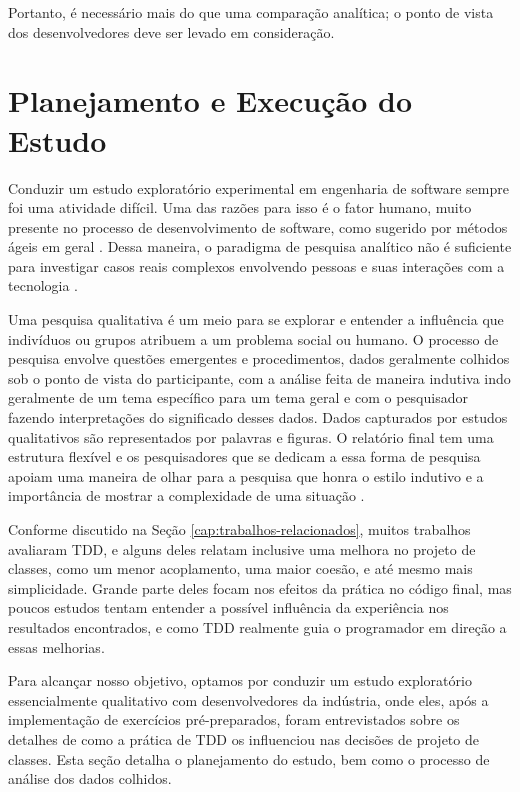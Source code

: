 \documentclass[conference]{IEEEtran}
\begin{document}
Portanto, é necessário mais do que uma comparação analítica; o
ponto de vista dos desenvolvedores deve ser levado em consideração.

\section{Planejamento e Execução do Estudo} 
\label{sec:planejamento}

Conduzir um estudo exploratório experimental em engenharia de software sempre foi uma
atividade difícil. Uma das razões para isso é o fator humano, muito presente 
no processo de desenvolvimento de software, como sugerido por métodos ágeis  em
geral \cite{AgileManifesto}. Dessa maneira, o paradigma de pesquisa analítico 
não é suficiente para investigar casos reais complexos envolvendo pessoas e 
suas interações com a tecnologia \cite{guidelines-case-study}.

Uma pesquisa qualitativa é um meio para se explorar e entender a influência que 
indivíduos ou grupos atribuem a um problema social ou humano. O processo de
pesquisa envolve questões emergentes e procedimentos, dados geralmente colhidos
sob o ponto de vista do participante, com a análise feita de maneira indutiva
indo geralmente de um tema específico para um tema geral e com o pesquisador
fazendo interpretações do significado desses dados. Dados capturados por estudos
qualitativos são representados por palavras e figuras.
O relatório final tem uma estrutura flexível e os pesquisadores que se
dedicam a essa forma de pesquisa apoiam uma maneira de olhar para a pesquisa que
honra o estilo indutivo e a importância de mostrar a 
complexidade de uma situação \cite{creswell}.

Conforme discutido na Seção \ref{cap:trabalhos-relacionados}, muitos 
trabalhos avaliaram TDD, e alguns deles relatam inclusive uma melhora
no projeto de classes, como um menor acoplamento, uma maior coesão, e até mesmo
mais simplicidade. 
Grande parte deles focam nos efeitos da prática no código final, mas poucos 
estudos tentam entender a possível influência da experiência
nos resultados encontrados, e como TDD realmente guia o programador 
em direção a essas melhorias.

Para alcançar nosso objetivo, optamos por conduzir um estudo 
exploratório essencialmente qualitativo
com desenvolvedores da indústria, onde eles, após a implementação
de exercícios pré-preparados, foram entrevistados sobre os
detalhes de como a prática de TDD os influenciou nas 
decisões de projeto de classes.
Esta seção detalha o planejamento do estudo, 
bem como o processo de análise dos dados colhidos.
\end{document}
